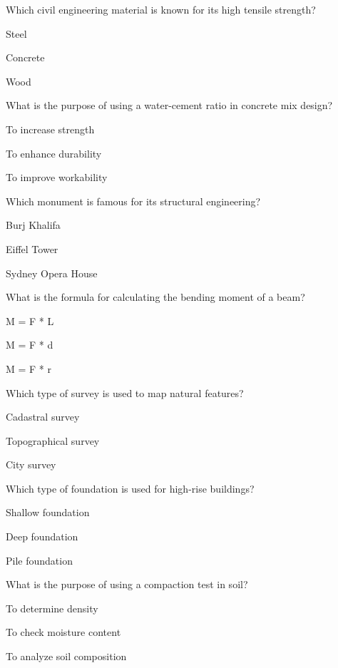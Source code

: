 \begin{enhancedmcq}{Which civil engineering material is known for its high tensile strength?}
\item Steel
\item Concrete
\item Wood

\end{enhancedmcq}
\begin{enhancedmcq}{What is the purpose of using a water-cement ratio in concrete mix design?}
\item To increase strength
\item To enhance durability
\item To improve workability

\end{enhancedmcq}
\begin{enhancedmcq}{Which monument is famous for its structural engineering?}
\item Burj Khalifa
\item Eiffel Tower
\item Sydney Opera House

\end{enhancedmcq}
\begin{enhancedmcq}{What is the formula for calculating the bending moment of a beam?}
\item M = F * L
\item M = F * d
\item M = F * r

\end{enhancedmcq}
\begin{enhancedmcq}{Which type of survey is used to map natural features?}
\item Cadastral survey
\item Topographical survey
\item City survey

\end{enhancedmcq}
\begin{enhancedmcq}{Which type of foundation is used for high-rise buildings?}
\item Shallow foundation
\item Deep foundation
\item Pile foundation

\end{enhancedmcq}
\begin{enhancedmcq}{What is the purpose of using a compaction test in soil?}
\item To determine density
\item To check moisture content
\item To analyze soil composition

\end{enhancedmcq}
